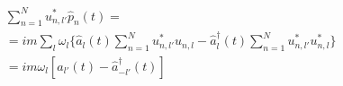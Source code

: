 \documentclass{article}
\begin{document}
\begin{align}
    & \sum_{ n = 1 }^N u^*_{ n, l' } \hat{p}_n (t) = \nonumber \\
    &= i m \sum_l \omega_l \biggl\lbrace \hat{a}_l (t) \sum_{ n = 1 }^N u^*_{ n, l' } u_{ n, l } - \hat{a}^\dagger_l (t) \sum_{ n = 1 }^N u^*_{ n, l' } u^*_{ n, l } \biggr\rbrace \nonumber \\
    &= i m \omega_l \left[ \hat{a}_{l'} (t) - \hat{a}^\dagger_{-l'} (t)  \right] \label{eq4} %
\end{align}


\end{document}
